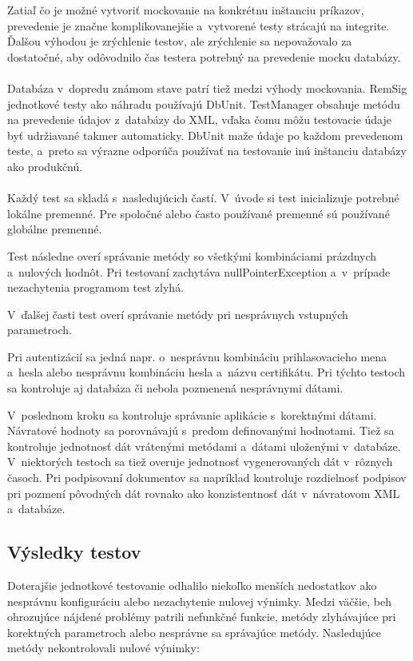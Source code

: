 \documentclass[
  digital, %
  table,   %
oneside,
  nolof,     %
  nolot,     %
]{fithesis3}
\begin{document}
Zatiaľ čo je možné vytvoriť mockovanie na konkrétnu inštanciu príkazov, prevedenie je značne komplikovanejšie a~vytvorené testy strácajú na integrite. Ďalšou výhodou je zrýchlenie testov, ale zrýchlenie sa nepovažovalo za dostatočné, aby odôvodnilo čas testera potrebný na prevedenie mocku databázy. \paragraph{}
Databáza v~dopredu známom stave patrí tiež medzi výhody mockovania. RemSig jednotkové testy ako náhradu  používajú DbUnit. TestManager obsahuje metódu na   prevedenie údajov z~databázy do XML, vďaka čomu môžu testovacie údaje byť udržiavané takmer automaticky. DbUnit maže údaje po každom prevedenom teste, a~preto sa výrazne odporúča používať na testovanie inú inštanciu databázy ako produkčnú. \paragraph{}

Každý test sa skladá s~nasledujúcich častí. V~úvode si test inicializuje potrebné lokálne premenné. Pre spoločné alebo často používané premenné sú používané globálne premenné. 

Test následne overí správanie metódy so všetkými kombináciami prázdnych a~nulových hodnôt. Pri testovaní zachytáva nullPointerException a~v~prípade nezachytenia programom test zlyhá.

V~ďalšej časti test overí správanie metódy pri nesprávnych vstupných parametroch.

 Pri autentizácií sa jedná napr. o~nesprávnu kombináciu prihlasovacieho mena a~hesla alebo nesprávnu kombináciu hesla a~názvu certifikátu. Pri týchto testoch sa kontroluje aj databáza či nebola pozmenená nesprávnymi dátami.
 
V~poslednom kroku sa kontroluje správanie aplikácie s~korektnými dátami. Návratové hodnoty sa porovnávajú s~predom definovanými hodnotami.
Tiež sa kontroluje jednotnosť dát vrátenými metódami a~dátami uloženými v~databáze. V~niektorých testoch sa tiež overuje jednotnosť vygenerovaných dát v~rôznych časoch. Pri podpisovaní dokumentov sa napríklad kontroluje rozdielnosť podpisov pri pozmení pôvodných dát rovnako ako konzistentnosť dát v~návratovom XML a~databáze.   

\subsection{Výsledky testov}
Doterajšie jednotkové testovanie odhalilo niekoľko menších nedostatkov ako nesprávnu konfiguráciu alebo nezachytenie nulovej výnimky. Medzi väčšie, beh ohrozujúce nájdené problémy patrili nefunkčné funkcie, metódy zlyhávajúce pri korektných parametroch alebo nesprávne sa správajúce metódy.  
Nasledujúce metódy nekontrolovali nulové výnimky: 
\end{document}
